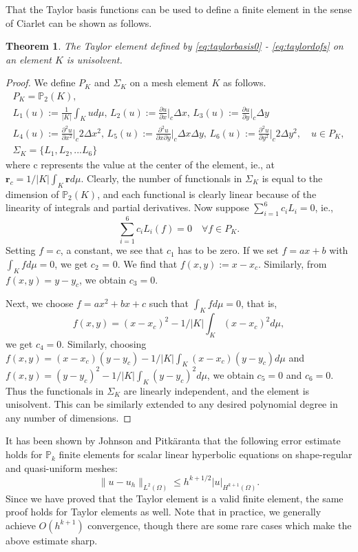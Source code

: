 \documentclass[11pt]{article}
\let\bld\boldsymbol
\newtheorem{theorem}{Theorem}
\begin{document}
That the Taylor basis functions can be used to define a finite element in the sense of Ciarlet can be shown as follows.
\begin{theorem}
The Taylor element defined by \eqref{eq:taylorbasis0} - \eqref{eq:taylordofs} on an element $K$ is unisolvent.
\end{theorem}
\begin{proof} We define $P_K$ and $\Sigma_K$ on a mesh element $K$ as follows.
\begin{multline}
P_K = \mathbb{P}_2(K), \\
L_1(u) := \frac{1}{|K|}\int_K u d\mu,\, L_2(u) := \frac{\partial u}{\partial x}\Big|_c \Delta x,\, L_3(u) := \frac{\partial u}{\partial y}\Big|_c \Delta y \\
L_4(u) := \frac{\partial^2 u}{\partial x^2}\Big|_c 2\Delta x^2,\,
L_5(u) := \frac{\partial^2 u}{\partial x\partial y}\Big|_c \Delta x\Delta y,\,
L_6(u) := \frac{\partial^2 u}{\partial y^2}\Big|_c 2\Delta y^2, \quad u \in P_K,\\
\Sigma_K = \{L_1, L_2, ... L_6\}
\end{multline}
where c represents the value at the center of the element, ie., at $\bld{r}_c = 1/|K|\int_K \bld{r}d\mu$. Clearly, the number of functionals in $\Sigma_K$ is equal to the dimension of $\mathbb{P}_2(K)$, and each functional is clearly linear because of the linearity of integrals and partial derivatives. Now suppose $\sum_{i=1}^6 c_i L_i = 0$, ie.,
\begin{equation}
\sum_{i=1}^6 c_i L_i(f) = 0 \quad \forall f \in P_K.
\end{equation}
Setting $f = c$, a constant, we see that $c_1$ has to be zero. If we set $f = ax+b$ with $\int_K f d\mu = 0$, we get $c_2$ = 0. We find that $f(x,y) := x-x_c$. Similarly, from $f(x,y) = y-y_c$, we obtain $c_3 = 0$.

Next, we choose $f = ax^2+bx+c$ such that $\int_K f d\mu = 0$, that is, \[f(x,y) = (x-x_c)^2 - 1/|K|\int_K(x-x_c)^2d\mu, \] we get $c_4 = 0$. Similarly, choosing $f(x,y) = (x-x_c)(y-y_c) - 1/|K|\int_K(x-x_c)(y-y_c)d\mu$ and $f(x,y) = (y-y_c)^2 - 1/|K|\int_K(y-y_c)^2d\mu$, we obtain $c_5 = 0$ and $c_6 = 0$. Thus the functionals in $\Sigma_K$ are linearly independent, and the element is unisolvent. This can be similarly extended to any desired polynomial degree in any number of dimensions.
\end{proof}

It has been shown by Johnson and Pitk\"aranta \cite{johnson_pitkaranta} that the following error estimate holds for $\mathbb{P}_k$ finite elements for scalar linear hyperbolic equations on shape-regular and quasi-uniform meshes:
\begin{equation}
\lVert u-u_h \rVert_{L^2(\Omega)} \leq h^{k+1/2} |u|_{H^{k+1}(\Omega)}.
\end{equation}
Since we have proved that the Taylor element is a valid finite element, the same proof holds for Taylor elements as well. Note that in practice, we generally achieve $O(h^{k+1})$ convergence, though there are some rare cases which make the above estimate sharp.
\end{document}
